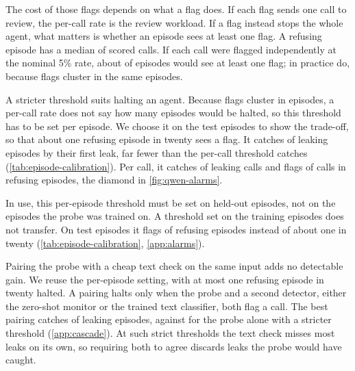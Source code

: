 The cost of those flags depends on what a flag does.
If each flag sends one call to review, the per-call rate is the review workload.
If a flag instead stops the whole agent, what matters is whether an episode sees at least one flag.
A refusing episode has a median of \qwenFreshMedianRefusingCalls{} scored calls.
If each call were flagged independently at the nominal 5\% rate, about \qwenEpisodeAlarmIndependent{} of episodes would see at least one flag; in practice \qwenFreshRefusingEpisodeAlarm{} do, because flags cluster in the same episodes.

A stricter threshold suits halting an agent.
Because flags cluster in episodes, a per-call rate does not say how many episodes would be halted, so this threshold has to be set per episode.
We choose it on the test episodes to show the trade-off, so that about one refusing episode in twenty sees a flag.
It catches \qwenEpisodeCalCaught{} of leaking episodes by their first leak, far fewer than the per-call threshold catches (\cref{tab:episode-calibration}).
Per call, it catches \qwenCalibrationEpisodeLeakCallsRateRounded{} of leaking calls and flags \qwenCalibrationEpisodeRefusingCallsRate{} of calls in refusing episodes, the diamond in \cref{fig:qwen-alarms}.

In use, this per-episode threshold must be set on held-out episodes, not on the episodes the probe was trained on.
A threshold set on the training episodes does not transfer.
On test episodes it flags \qwenEpisodeCalTrainRefusingEpisodes{} of refusing episodes instead of about one in twenty (\cref{tab:episode-calibration}, \cref{app:alarms}).

Pairing the probe with a cheap text check on the same input adds no detectable gain.
We reuse the per-episode setting, with at most one refusing episode in twenty halted.
A pairing halts only when the probe and a second detector, either the zero-shot monitor or the trained text classifier, both flag a call.
The best pairing catches \cascadeBowGridFiveCaught{} of \qwenCalibrationEpisodeLeakEpisodesDenominator{} leaking episodes, against \cascadeProbeAloneFiveCaught{} for the probe alone with a stricter threshold (\cref{app:cascade}).
At such strict thresholds the text check misses most leaks on its own, so requiring both to agree discards leaks the probe would have caught.

